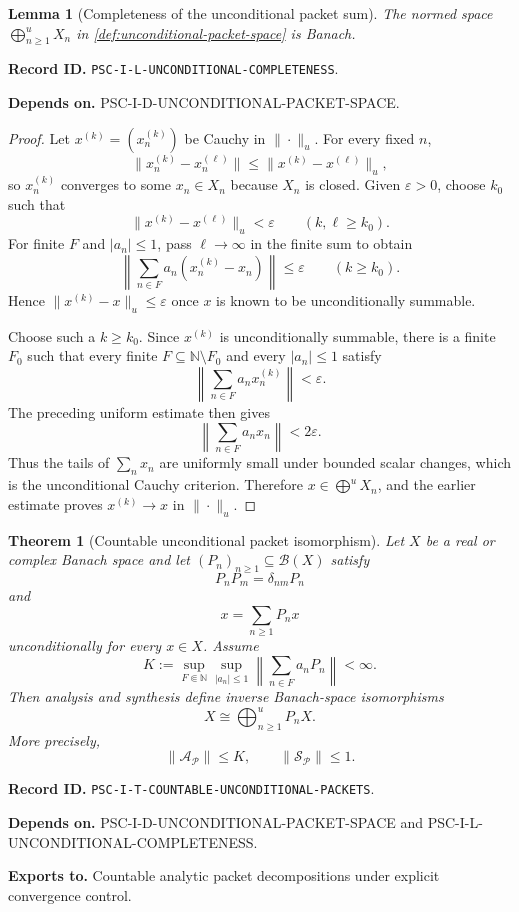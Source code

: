 \documentclass[11pt]{article}
\newtheorem{theorem}{Theorem}[section]
\newtheorem{lemma}[lemma]{Lemma}
\theoremstyle{definition}
\theoremstyle{remark}
\newcommand{\Pcal}{\mathcal P}
\newcommand{\RecordID}[1]{\par\smallskip\noindent\begingroup\footnotesize\color{PSCGray}\raggedright\textbf{Record ID.} \nolinkurl{#1}.\par\endgroup}
\newcommand{\Depends}[1]{\par\noindent\begingroup\footnotesize\color{PSCGray}\raggedright\textbf{Depends on.} #1\par\endgroup}
\newcommand{\Exports}[1]{\par\noindent\begingroup\footnotesize\color{PSCGray}\raggedright\textbf{Exports to.} #1\par\endgroup}
\begin{document}
\begin{lemma}[Completeness of the unconditional packet sum]
\label{lem:unconditional-completeness}
The normed space $\bigoplus_{n\geq1}^{u}X_n$ in \cref{def:unconditional-packet-space} is Banach.
\end{lemma}
\RecordID{PSC-I-L-UNCONDITIONAL-COMPLETENESS}
\Depends{PSC-I-D-UNCONDITIONAL-PACKET-SPACE.}

\begin{proof}
Let $x^{(k)}=(x_n^{(k)})$ be Cauchy in $\|\cdot\|_u$.  For every fixed $n$,
\[
\|x_n^{(k)}-x_n^{(\ell)}\|
\leq
\|x^{(k)}-x^{(\ell)}\|_u,
\]
so $x_n^{(k)}$ converges to some $x_n\in X_n$ because $X_n$ is closed.  Given $\varepsilon>0$, choose $k_0$ such that
\[
\|x^{(k)}-x^{(\ell)}\|_u<\varepsilon
\qquad(k,\ell\geq k_0).
\]
For finite $F$ and $|a_n|\leq1$, pass $\ell\to\infty$ in the finite sum to obtain
\[
\left\|\sum_{n\in F}a_n(x_n^{(k)}-x_n)\right\|
\leq\varepsilon
\qquad(k\geq k_0).
\]
Hence $\|x^{(k)}-x\|_u\leq\varepsilon$ once $x$ is known to be unconditionally summable.

Choose such a $k\geq k_0$.  Since $x^{(k)}$ is unconditionally summable, there is a finite $F_0$ such that every finite $F\subseteq\mathbb N\setminus F_0$ and every $|a_n|\leq1$ satisfy
\[
\left\|\sum_{n\in F}a_nx_n^{(k)}\right\|<\varepsilon.
\]
The preceding uniform estimate then gives
\[
\left\|\sum_{n\in F}a_nx_n\right\|<2\varepsilon.
\]
Thus the tails of $\sum_nx_n$ are uniformly small under bounded scalar changes, which is the unconditional Cauchy criterion.  Therefore $x\in\bigoplus^uX_n$, and the earlier estimate proves $x^{(k)}\to x$ in $\|\cdot\|_u$.
\end{proof}

\begin{theorem}[Countable unconditional packet isomorphism]
\label{thm:countable-packets}
Let $X$ be a real or complex Banach space and let $(P_n)_{n\geq1}\subseteq\mathcal B(X)$ satisfy
\[
P_nP_m=\delta_{nm}P_n
\]
and
\[
x=\sum_{n\geq1}P_nx
\]
unconditionally for every $x\in X$.  Assume
\[
K:=
\sup_{F\Subset\mathbb N}
\sup_{|a_n|\leq1}
\left\|\sum_{n\in F}a_nP_n\right\|<\infty.
\]
Then analysis and synthesis define inverse Banach-space isomorphisms
\[
\boxed{
X\cong\bigoplus_{n\geq1}^{u}P_nX.
}
\]
More precisely,
\[
\|\mathcal A_{\Pcal}\|\leq K,
\qquad
\|\mathcal S_{\Pcal}\|\leq1.
\]
\end{theorem}
\RecordID{PSC-I-T-COUNTABLE-UNCONDITIONAL-PACKETS}
\Depends{PSC-I-D-UNCONDITIONAL-PACKET-SPACE and PSC-I-L-UNCONDITIONAL-COMPLETENESS.}
\Exports{Countable analytic packet decompositions under explicit convergence control.}
\end{document}
